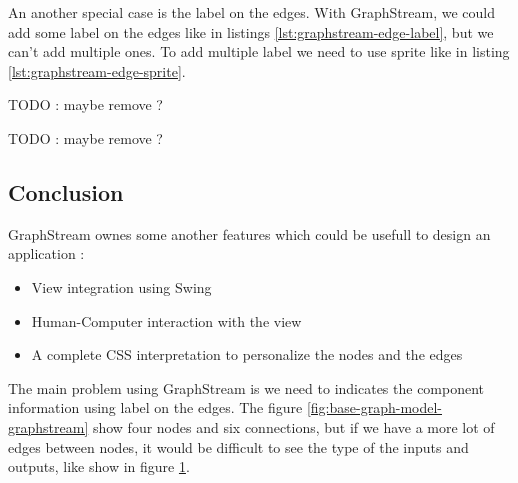 An another special case is the label on the edges. With GraphStream, we could
add some label on the edges like in listings \ref{lst:graphstream-edge-label},
but we can't add multiple ones. To add multiple label we need to use sprite like
in listing \ref{lst:graphstream-edge-sprite}.

\begin{listing}[p]
  \centering
  \caption[Add a label on an edge with GraphStream]{TODO : maybe remove ?}
  \label{lst:graphstream-edge-label}
\end{listing}

\begin{listing}[p]
  \centering
  \caption[Add two label on an edge with GraphStream]{TODO : maybe remove ?}
  \label{lst:graphstream-edge-sprite}
\end{listing}


\subsection{Conclusion}
\label{sub:Conclusion-gs}

GraphStream ownes some another features which could be usefull to design an application :
\begin{itemize}
\item View integration using Swing
\item Human-Computer interaction with the view
\item A complete CSS interpretation to personalize the nodes and the edges
\end{itemize}

The main problem using GraphStream is we need to indicates the component
information using label on the edges. The figure
\ref{fig:base-graph-model-graphstream} show four nodes and six connections, but
if we have a more lot of edges between nodes, it would be difficult to see the
type of the inputs and outputs, like show in figure
\ref{fig:graphstream-lot-of-edges}.

\begin{figure}[h]
  \centering
  \caption[Label on multiple edges using GraphStream]{}
  \label{fig:graphstream-lot-of-edges}
\end{figure}

